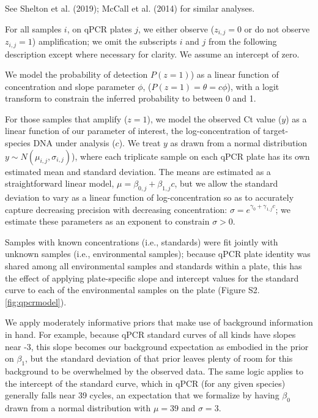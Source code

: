 \documentclass[
]{article}
\begin{document}
See Shelton et al. (2019); McCall et al. (2014) for similar analyses.

For all samples \(i\), on qPCR plates \(j\), we either observe
(\(z_{i,j} = 0\) or do not observe \(z_{i,j} = 1\)) amplification; we
omit the subscripts \(i\) and \(j\) from the following description
except where necessary for clarity. We assume an intercept of zero.

We model the probability of detection \(P(z = 1)\)) as a linear function
of concentration and slope parameter \(\phi\),
(\(P(z = 1) = \theta = c\phi\)), with a logit transform to constrain the
inferred probability to between 0 and 1.

For those samples that amplify (\(z = 1\)), we model the observed Ct
value (\(y\)) as a linear function of our parameter of interest, the
log-concentration of target-species DNA under analysis (\(c\)). We treat
\(y\) as drawn from a normal distribution
\(y \sim N(\mu_{i,j}, \sigma_{i,j})\)), where each triplicate sample on
each qPCR plate has its own estimated mean and standard deviation. The
means are estimated as a straightforward linear model,
\(\mu = \beta_{0,j} + \beta_{1,j}c\), but we allow the standard
deviation to vary as a linear function of log-concentration so as to
accurately capture decreasing precision with decreasing concentration:
\(\sigma = e^{\gamma_{0} + \gamma_{1,j}c}\); we estimate these
parameters as an exponent to constrain \(\sigma > 0\).

Samples with known concentrations (i.e., standards) were fit jointly
with unknown samples (i.e., environmental samples); because qPCR plate
identity was shared among all environmental samples and standards within
a plate, this has the effect of applying plate-specific slope and
intercept values for the standard curve to each of the environmental
samples on the plate (Figure S2.\ref{fig:qpcrmodel}).

We apply moderately informative priors that make use of background
information in hand. For example, because qPCR standard curves of all
kinds have slopes near -3, this slope becomes our background expectation
as embodied in the prior on \(\beta_1\), but the standard deviation of
that prior leaves plenty of room for this background to be overwhelmed
by the observed data. The same logic applies to the intercept of the
standard curve, which in qPCR (for any given species) generally falls
near 39 cycles, an expectation that we formalize by having \(\beta_0\)
drawn from a normal distribution with \(\mu = 39\) and \(\sigma = 3\).
\end{document}
